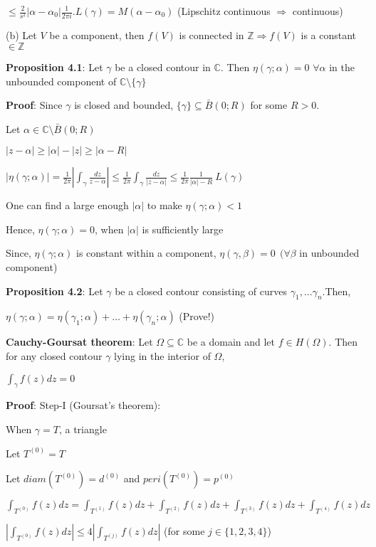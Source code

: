 \documentclass{article}
\begin{document}
\begin{flushleft}
$\leq \frac{2}{s^2}|\alpha -\alpha_0|\frac{1}{2\pi i}.L(\gamma)=M(\alpha-\alpha_0)$ (Lipschitz continuous $\Rightarrow$ continuous)

(b) Let $V$ be a component, then $f(V)$ is connected in $\mathds{Z}\Rightarrow f(V)$ is a constant $\in \mathds{Z}$

\textbf{Proposition 4.1}: Let $\gamma$ be a closed contour in $\mathds{C}$. Then $\eta(\gamma;\alpha)=0$ $\forall \alpha$ in the unbounded component of $\mathds{C}\setminus \{\gamma\}$

\textbf{Proof}: Since $\gamma$ is closed and bounded, $\{\gamma\}\subseteq \bar{B}(0;R)$ for some $R>0$.

Let $\alpha \in\mathds{C}\setminus \bar{B}(0;R)$ 

$|z-\alpha|\geq |\alpha|-|z|\geq |\alpha-R|$

$|\eta(\gamma;\alpha)|=\frac{1}{2\pi}|\int_{\gamma}^{}\frac{dz}{z-\alpha}| \leq \frac{1}{2\pi} \int_{\gamma}^{}\frac{dz}{|z-\alpha|}\leq \frac{1}{2\pi} \frac{1}{|\alpha|-R}\:L(\gamma)$

One can find a large enough $|\alpha|$ to make $\eta(\gamma;\alpha)<1$

Hence, $\eta(\gamma;\alpha)=0$, when $|\alpha|$ is sufficiently large 

Since, $\eta(\gamma;\alpha)$ is constant within a component, $\eta(\gamma,\beta)=0 \:\:(\forall \beta$ in unbounded component)

\textbf{Proposition 4.2}: Let $\gamma$ be a closed contour consisting of curves $\gamma_1,\dots \gamma_n$.Then,

$\eta(\gamma;\alpha)=\eta(\gamma_1;\alpha)+\dots +\eta(\gamma_n;\alpha)$ (Prove!)

\textbf{Cauchy-Goursat theorem}: Let $\Omega\subseteq \mathds{C}$ be a domain and let $f\in H(\Omega)$. Then for any closed contour $\gamma$ lying in the interior of $\Omega$,

$\int_{\gamma}^{} f(z) dz=0$

\textbf{Proof}: Step-I (Goursat's theorem): 

When $\gamma=T$, a triangle

Let $T^{(0)}=T$

Let $diam(T^{(0)})=d^{(0)}$ and $peri(T^{(0)})=p^{(0)}$


$\int_{T^{(0)}}^{} f(z) dz =\int_{T^{(1)}}^{} f(z) dz + \int_{T^{(2)}}^{} f(z) dz + \int_{T^{(3)}}^{} f(z) dz + \int_{T^{(4)}}^{} f(z) dz$

$|\int_{T^{(0)}}^{} f(z) dz| \leq 4|\int_{T^{(j)}}^{} f(z) dz|$ (for some $j\in \{1,2,3,4\}$)


\end{flushleft}
\end{document}
